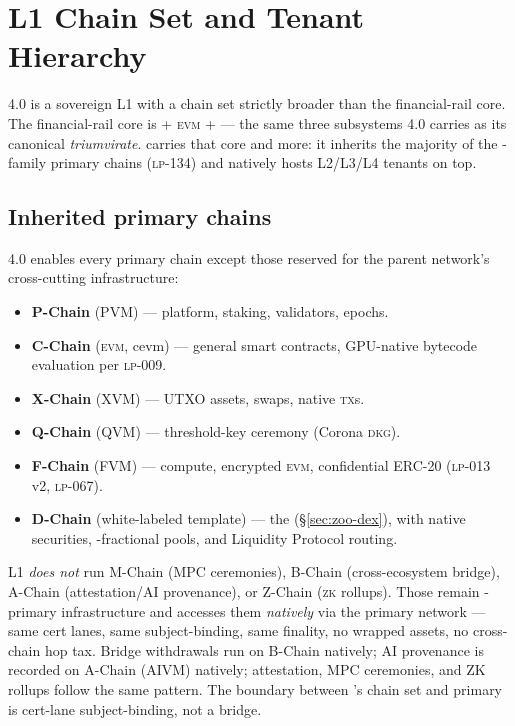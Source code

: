 \section{\Zoo{} L1 Chain Set and Tenant Hierarchy}
\label{sec:chain-set}

\Zoo{} 4.0 is a sovereign L1 with a chain set strictly broader than
the financial-rail core. The financial-rail core is \DEX{} + \textsc{evm}
+ \FHE{} --- the same three subsystems \Hanzo{} 4.0 carries as its
canonical \emph{triumvirate}\cite{hanzo-4-0}. \Zoo{} carries that core
and more: it inherits the majority of the \Lux{}-family primary chains
(\textsc{lp-134}\cite{lp-134}) and natively hosts L2/L3/L4 tenants on
top.

\subsection{Inherited \Lux{} primary chains}

\Zoo{} 4.0 enables every \Lux{} primary chain except those reserved for
the parent network's cross-cutting infrastructure:

\begin{itemize}[leftmargin=1.2em]
  \item \textbf{P-Chain} (PVM) --- platform, staking, validators, epochs.
  \item \textbf{C-Chain} (\textsc{evm}, cevm) --- general smart
        contracts, GPU-native bytecode evaluation per \textsc{lp-009}.
  \item \textbf{X-Chain} (XVM) --- UTXO assets, swaps, native \textsc{tx}s.
  \item \textbf{Q-Chain} (QVM) --- \Quasar{} threshold-key ceremony
        (Corona \textsc{dkg}).
  \item \textbf{F-Chain} (FVM) --- \FHE{} compute, encrypted
        \textsc{evm}, confidential ERC-20 (\textsc{lp-013} v2,
        \textsc{lp-067}).
  \item \textbf{D-Chain} (white-labeled \DEX{} template) --- the \Zoo{}
        \DEX{} (\S\ref{sec:zoo-dex}), with native securities,
        \NFT{}-fractional pools, and Liquidity Protocol routing.
\end{itemize}

\Zoo{} L1 \emph{does not} run M-Chain (MPC ceremonies), B-Chain
(cross-ecosystem bridge), A-Chain (attestation/AI provenance), or
Z-Chain (\textsc{zk} rollups). Those remain \Lux{}-primary
infrastructure and \Zoo{} accesses them \emph{natively} via the
\Lux{} primary network --- same \Quasar{} cert lanes, same
subject-binding, same finality, no wrapped assets, no cross-chain
hop tax. Bridge withdrawals run on \Lux{} B-Chain natively; AI
provenance is recorded on \Lux{} A-Chain (AIVM) natively;
attestation, MPC ceremonies, and ZK rollups follow the same
pattern. The boundary between \Zoo{}'s chain set and \Lux{} primary
is cert-lane subject-binding, not a bridge.

